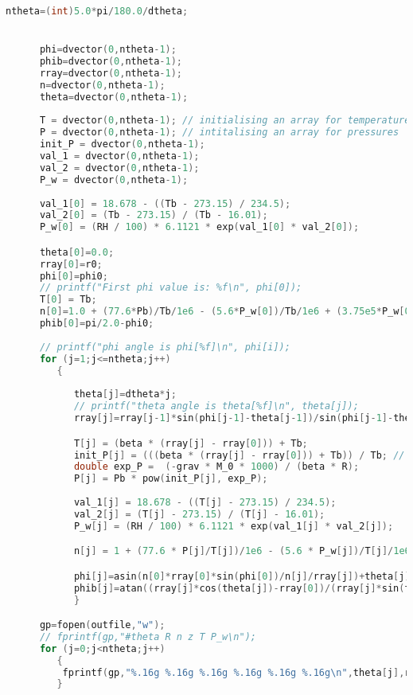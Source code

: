 \documentclass[11pt]{article}
\begin{document}
\begin{footnotesize}
\begin{lstlisting}[language=c,showstringspaces=false]
      ntheta=(int)5.0*pi/180.0/dtheta;


      phi=dvector(0,ntheta-1);
      phib=dvector(0,ntheta-1);
      rray=dvector(0,ntheta-1);
      n=dvector(0,ntheta-1);
      theta=dvector(0,ntheta-1);
     
      T = dvector(0,ntheta-1); // initialising an array for temperatures
      P = dvector(0,ntheta-1); // intitalising an array for pressures
      init_P = dvector(0,ntheta-1);
      val_1 = dvector(0,ntheta-1); 
      val_2 = dvector(0,ntheta-1);
      P_w = dvector(0,ntheta-1);
     
      val_1[0] = 18.678 - ((Tb - 273.15) / 234.5);
      val_2[0] = (Tb - 273.15) / (Tb - 16.01);
      P_w[0] = (RH / 100) * 6.1121 * exp(val_1[0] * val_2[0]);

      theta[0]=0.0;
      rray[0]=r0;
      phi[0]=phi0;
      // printf("First phi value is: %f\n", phi[0]);
      T[0] = Tb;
      n[0]=1.0 + (77.6*Pb)/Tb/1e6 - (5.6*P_w[0])/Tb/1e6 + (3.75e5*P_w[0])/pow(Tb, 2)/1e6;
      phib[0]=pi/2.0-phi0;
   
      // printf("phi angle is phi[%f]\n", phi[i]);
      for (j=1;j<=ntheta;j++)
         {
            
            theta[j]=dtheta*j;
            // printf("theta angle is theta[%f]\n", theta[j]);
            rray[j]=rray[j-1]*sin(phi[j-1]-theta[j-1])/sin(phi[j-1]-theta[j]);

            T[j] = (beta * (rray[j] - rray[0])) + Tb;
            init_P[j] = (((beta * (rray[j] - rray[0])) + Tb)) / Tb; // (in hPa)
            double exp_P =  (-grav * M_0 * 1000) / (beta * R);
            P[j] = Pb * pow(init_P[j], exp_P);
            
            val_1[j] = 18.678 - ((T[j] - 273.15) / 234.5);
            val_2[j] = (T[j] - 273.15) / (T[j] - 16.01);
            P_w[j] = (RH / 100) * 6.1121 * exp(val_1[j] * val_2[j]);

            n[j] = 1 + (77.6 * P[j]/T[j])/1e6 - (5.6 * P_w[j])/T[j]/1e6 + (3.75e5 * P_w[j])/pow(T[j], 2)/1e6;

            phi[j]=asin(n[0]*rray[0]*sin(phi[0])/n[j]/rray[j])+theta[j];
            phib[j]=atan((rray[j]*cos(theta[j])-rray[0])/(rray[j]*sin(theta[j]))); /* bhatdotrhatv */       
            }

      gp=fopen(outfile,"w");
      // fprintf(gp,"#theta R n z T P_w\n");
      for (j=0;j<ntheta;j++)
         {
          fprintf(gp,"%.16g %.16g %.16g %.16g %.16g %.16g\n",theta[j],rray[j],n[j],phi[j]-theta[j],T[j],P_w[j]);
         }


\end{lstlisting}
\end{footnotesize}
\end{document}
